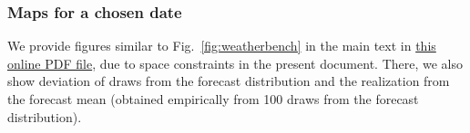 \documentclass[twoside,11pt]{article}
\begin{document}
	
	
	\subsubsection{Maps for a chosen date}%
	
	We provide figures similar to Fig.~\ref{fig:weatherbench} in the main text in \href{https://github.com/LoryPack/GenerativeNetworksScoringRulesProbabilisticForecasting/blob/main/additional_results.pdf}{this online PDF file}, due to space constraints in the present document. There, we also show deviation of draws from the forecast distribution and the realization from the forecast mean (obtained empirically from 100 draws from the forecast distribution).
	
	

\end{document}
